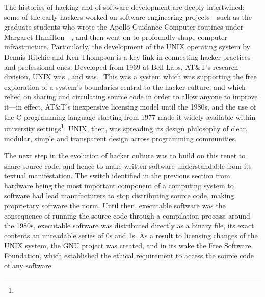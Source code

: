 The histories of hacking and of software development are deeply intertwined: some of the early hackers worked on software engineering projects—such as the graduate students who wrote the Apollo Guidance Computer routines under Margaret Hamilton—, and then went on to profoundly shape computer infrastructure. Particularly, the development of the UNIX operating system by Dennis Ritchie and Ken Thompson is a key link in connecting hacker practices and professional ones. Developed from 1969 at Bell Labs, AT\&T's research division, UNIX was , and was .  This was a system which was supporting the free exploration of a system's boundaries central to the hacker culture, and which relied on sharing and circulating source code in order to allow anyone to improve it—in effect, AT\&T's inexpensive licensing model until the 1980s, and the use of the C programming language starting from 1977 made it widely available within university settings\footnote{}. UNIX, then, was spreading its design philosophy of clear, modular, simple and transparent design across programming communities.

The next step in the evolution of hacker culture was to build on this tenet to share source code, and hence to make written software understandable from its textual manifestation. The switch identified in the previous section from hardware being the most important component of a computing system to software had lead manufacturers to stop distributing source code, making proprietary software the norm. Until then, executable software was the consequence of running the source code through a compilation process; around the 1980s, executable software was distributed directly as a binary file, its exact contents an unreadable series of 0s and 1s. As a result to licensing changes of the UNIX system, the GNU project was created, and in its wake the Free Software Foundation,  which established the ethical requirement to access the source code of any software.

